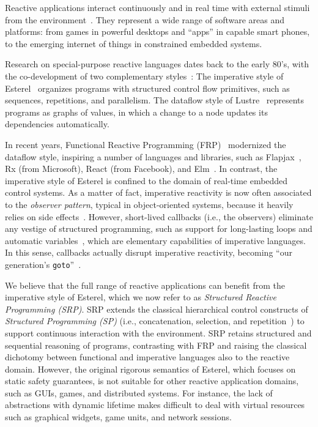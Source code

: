\documentclass{acm_proc_article-sp}
\newcommand{\code}[1] {{\small{\texttt{#1}}}}
\newcommand{\1}{\;}
\newcommand{\2}{\;\;}
\newcommand{\3}{\;\;\;}
\newcommand{\5}{\;\;\;\;\;}
\begin{document}
Reactive applications interact continuously and in real time with external 
stimuli from the environment~\cite{statecharts.reactive,rp.synchronous}.
They represent a wide range of software areas and platforms: from games in 
powerful desktops and ``apps'' in capable smart phones, to the emerging 
internet of things in constrained embedded systems.

Research on special-purpose reactive languages dates back to the early 80's, 
with the co-development of two complementary 
styles~\cite{rp.twelve,rp.hypothesis}:
%
The imperative style of Esterel~\cite{esterel.ieee91} organizes programs with 
structured control flow primitives, such as sequences, repetitions, and 
parallelism.
%
The dataflow style of Lustre~\cite{lustre.ieee91} represents programs as graphs 
of values, in which a change to a node updates its dependencies automatically.

In recent years, Functional Reactive Programming (FRP)~\cite{frp.principles} 
modernized the dataflow style, inspiring a number of languages and libraries, 
such as Flapjax~\cite{frp.flapjax}, Rx (from Microsoft), React (from Facebook), 
and Elm~\cite{frp.elm}.
%
In contrast, the imperative style of Esterel is confined to the domain of 
real-time embedded control systems.
%
As a matter of fact, imperative reactivity is now often associated to the 
\emph{observer pattern}, typical in object-oriented systems, because it heavily 
relies on side effects~\cite{rp.deprecating,rp.rescala}.
%
However, short-lived callbacks (i.e., the observers) eliminate any vestige of 
structured programming, such as support for long-lasting loops and automatic 
variables~\cite{sync_async.cooperative}, which are elementary capabilities of 
imperative languages.
%
In this sense, callbacks actually disrupt imperative reactivity, becoming ``our 
generation's \code{goto}''~\cite{rp.goto,elm.goto}.

We believe that the full range of reactive applications can benefit from the 
imperative style of Esterel, which we now refer to as \emph{Structured Reactive 
Programming (SRP)}.
%
SRP extends the classical hierarchical control constructs of \emph{Structured 
Programming (SP)} (i.e., concatenation, selection, and 
repetition~\cite{dij.notes}) to support continuous interaction with the 
environment.
%
SRP retains structured and sequential reasoning of programs, contrasting with 
FRP and raising the classical dichotomy between functional and imperative 
languages also to the reactive domain.
%
However, the original rigorous semantics of Esterel, which focuses on static 
safety guarantees, is not suitable for other reactive application domains, such 
as GUIs, games, and distributed systems.
%
For instance, the lack of abstractions with dynamic lifetime makes difficult to 
deal with virtual resources such as graphical widgets, game units, and network 
sessions.
\end{document}
